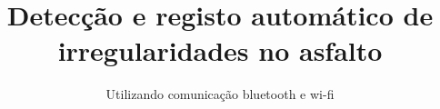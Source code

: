 \documentclass[
  doctype=msc,     		%
  school=unl/fct,       %
  lang=pt,              %
  coverlang=pt,         %
  copyrightlang=pt,     %
  fontstyle=kpfonts,    %
  chapstyle=elegant,    %
  otherlistsat=front,   %
  aftercover=false,     %
	linkscolor=black,  %
  printcommittee=true,  %
	spine=false,          %
	biblatex={            %
		style=authoryear,      %
		sorting=nyt,        %
		firstinits=true,    %
		sortcites=true,     %
   		hyperref=false       %
	},
	memoir={	            %
    a4paper,            %
    11pt,               %
    final,              %
  },
  media=screen,         %
]{unlthesis}
\title{Detecção e registo automático de \\irregularidades no asfalto}
\subtitle{Utilizando comunicação bluetooth e wi-fi}
\begin{document}
\nocite{*}
\thesisfrontmatter	%
\printcoverpage		%
\printdedicatory	%
\printacknowledgements	%
\printquote		%
\printabstract		%
\tableofcontents* 	%
\printotherlists 	%


\thesismainmatter	%
\printchapthers		%
\printbib			%
\printappendixes	%
\end{document}
